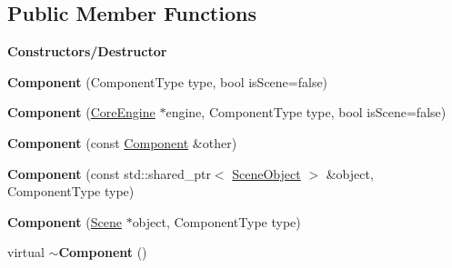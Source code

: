 \subsection*{Public Member Functions}
\begin{Indent}\textbf{ Constructors/\+Destructor}\par
\begin{DoxyCompactItemize}
\item 
\mbox{\label{classrev_1_1_component_aacfb2093732e9e43bdaa68da94687323}} 
{\bfseries Component} (Component\+Type type, bool is\+Scene=false)
\item 
\mbox{\label{classrev_1_1_component_ac1a0b2f0214dd2356f93d0b7a6610ed1}} 
{\bfseries Component} (\mbox{\hyperlink{classrev_1_1_core_engine}{Core\+Engine}} $\ast$engine, Component\+Type type, bool is\+Scene=false)
\item 
\mbox{\label{classrev_1_1_component_a87cc1dda0057fb3790f7cf915691b1d3}} 
{\bfseries Component} (const \mbox{\hyperlink{classrev_1_1_component}{Component}} \&other)
\item 
\mbox{\label{classrev_1_1_component_a9843b4acaa8714e75167f8dd5d29fd9c}} 
{\bfseries Component} (const std\+::shared\+\_\+ptr$<$ \mbox{\hyperlink{classrev_1_1_scene_object}{Scene\+Object}} $>$ \&object, Component\+Type type)
\item 
\mbox{\label{classrev_1_1_component_ad40cffa0788af51a3fe0aa5e487ad810}} 
{\bfseries Component} (\mbox{\hyperlink{classrev_1_1_scene}{Scene}} $\ast$object, Component\+Type type)
\item 
\mbox{\label{classrev_1_1_component_a0e1eaeca23bd6479196675dbd02df819}} 
virtual {\bfseries $\sim$\+Component} ()
\end{DoxyCompactItemize}
\end{Indent}
